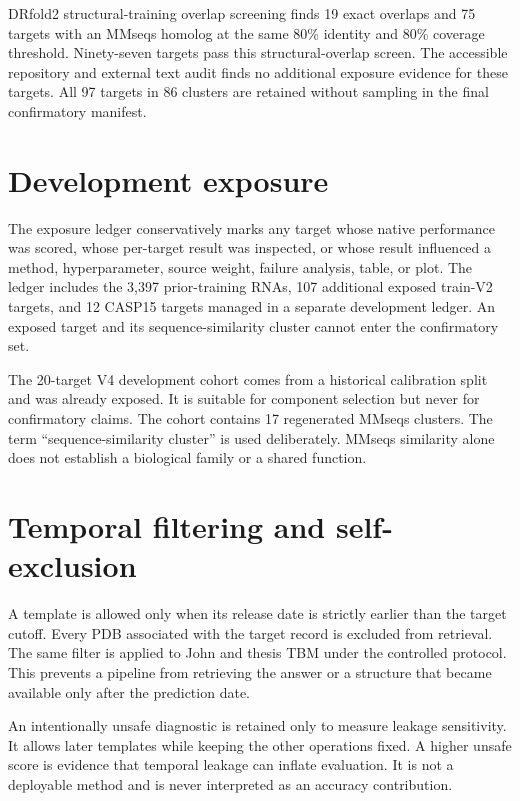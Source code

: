 \documentclass[12pt,a4paper,oneside]{report}
\begin{document}
DRfold2 structural-training overlap screening finds 19 exact overlaps and 75 targets
with an MMseqs homolog at the same 80\% identity and 80\% coverage threshold. Ninety-seven
targets pass this structural-overlap screen. The accessible repository and external
text audit finds no additional exposure evidence for these targets. All 97 targets in
86 clusters are retained without sampling in the final confirmatory manifest.

\section{Development exposure}

The exposure ledger conservatively marks any target whose native performance was
scored, whose per-target result was inspected, or whose result influenced a method,
hyperparameter, source weight, failure analysis, table, or plot. The ledger includes
the 3,397 prior-training RNAs, 107 additional exposed train-V2 targets, and 12 CASP15
targets managed in a separate development ledger. An exposed target and its
sequence-similarity cluster cannot enter the confirmatory set.

The 20-target V4 development cohort comes from a historical calibration split and was
already exposed. It is suitable for component selection but never for confirmatory
claims. The cohort contains 17 regenerated MMseqs clusters. The term
``sequence-similarity cluster'' is used deliberately. MMseqs similarity alone does not
establish a biological family or a shared function.

\section{Temporal filtering and self-exclusion}

A template is allowed only when its release date is strictly earlier than the target
cutoff. Every PDB associated with the target record is excluded from retrieval. The
same filter is applied to John and thesis TBM under the controlled protocol. This
prevents a pipeline from retrieving the answer or a structure that became available
only after the prediction date.

An intentionally unsafe diagnostic is retained only to measure leakage sensitivity.
It allows later templates while keeping the other operations fixed. A higher unsafe
score is evidence that temporal leakage can inflate evaluation. It is not a deployable
method and is never interpreted as an accuracy contribution.
\end{document}

